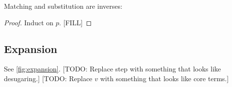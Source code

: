 \begin{lemma}
  Matching and substitution are inverses:
\end{lemma}
\begin{proof}
  Induct on $p$.
  [FILL]
\end{proof}

\subsection{Expansion}

See \cref{fig:expansion}.
[TODO: Replace step with something that looks like desugaring.]
[TODO: Replace $v$ with something that looks like core terms.]

